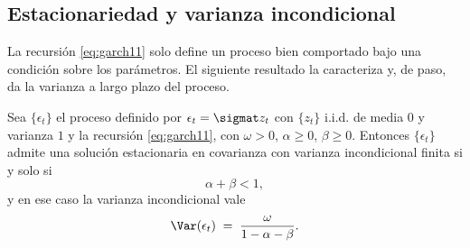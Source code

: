 \subsection{Estacionariedad y varianza incondicional}
\label{sec:garch-estac}

La recursión \eqref{eq:garch11} solo define un proceso bien comportado bajo una condición sobre los parámetros. El siguiente resultado la caracteriza y, de paso, da la varianza a largo plazo del proceso.

\begin{teorema}
\label{teo:garch-estac}
Sea $\{\epsilon_t\}$ el proceso definido por $\epsilon_t = \sigmat z_t$ con $\{z_t\}$ i.i.d. de media $0$ y varianza $1$ y la recursión \eqref{eq:garch11}, con $\omega > 0$, $\alpha \ge 0$, $\beta \ge 0$. Entonces $\{\epsilon_t\}$ admite una solución estacionaria en covarianza con varianza incondicional finita si y solo si
\[
\alpha + \beta < 1,
\]
y en ese caso la varianza incondicional vale
\[
\Var(\epsilon_t) \;=\; \frac{\omega}{1 - \alpha - \beta}.
\]
\end{teorema}

